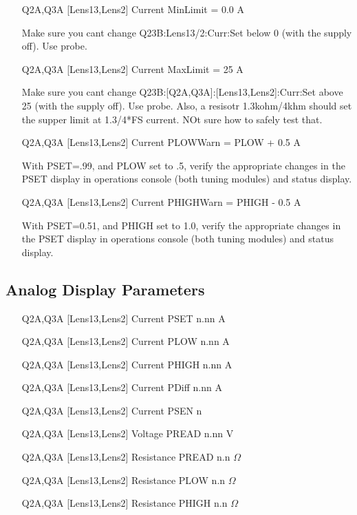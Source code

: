 \documentclass[11pt]{book}		%
\begin{document}
\begin{enumerate}
 \item [Q2A,Q3A] [Lens13,Lens2] Current MinLimit = 0.0 A

\color{red}
Make sure you cant change Q23B:Lens13/2:Curr:Set below 0 (with the supply off). Use probe.
\color{black}

 \item [Q2A,Q3A] [Lens13,Lens2] Current MaxLimit = 25 A

\color{red}
Make sure you cant change Q23B:[Q2A,Q3A]:[Lens13,Lens2]:Curr:Set above 25 (with the supply off). Use probe. Also, a resisotr 1.3kohm/4khm should set the supper limit at 1.3/4*FS current. NOt sure how to safely test that.
\color{black}

 \item [Q2A,Q3A] [Lens13,Lens2] Current PLOWWarn = PLOW + 0.5 A

\color{red}
With PSET=.99, and PLOW set to .5, verify the appropriate changes in the PSET display in operations console (both tuning modules) and status display.
\color{black}

 \item [Q2A,Q3A] [Lens13,Lens2] Current PHIGHWarn = PHIGH - 0.5 A

\color{red}
With PSET=0.51, and PHIGH set to 1.0, verify the appropriate changes in the PSET display in operations console (both tuning modules) and status display.
\color{black}

\end{enumerate}

\subsection{Analog Display Parameters} \label{sect:cyc-equip-ctl-beamline-quad23b-analog-display}

\begin{enumerate}
 \item [Q2A,Q3A] [Lens13,Lens2] Current PSET  n.nn A
 \item [Q2A,Q3A] [Lens13,Lens2] Current PLOW  n.nn A
 \item [Q2A,Q3A] [Lens13,Lens2] Current PHIGH n.nn A
 \item [Q2A,Q3A] [Lens13,Lens2] Current PDiff n.nn A
 \item [Q2A,Q3A] [Lens13,Lens2] Current PSEN  n
 \item [Q2A,Q3A] [Lens13,Lens2] Voltage PREAD n.nn V
 \item [Q2A,Q3A] [Lens13,Lens2] Resistance PREAD n.n $\Omega$
 \item [Q2A,Q3A] [Lens13,Lens2] Resistance PLOW n.n $\Omega$
 \item [Q2A,Q3A] [Lens13,Lens2] Resistance PHIGH n.n $\Omega$
\end{enumerate}
\end{document}
